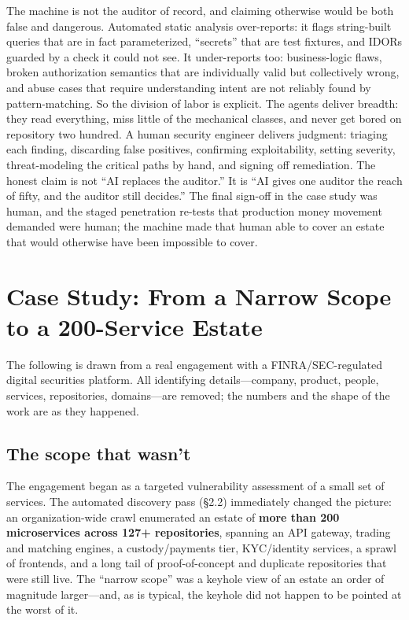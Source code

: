 \documentclass[11pt,letterpaper]{article}
\begin{document}
The machine is not the auditor of record, and claiming otherwise would be both
false and dangerous. Automated static analysis over-reports: it flags
string-built queries that are in fact parameterized, ``secrets'' that are test
fixtures, and IDORs guarded by a check it could not see. It under-reports too:
business-logic flaws, broken authorization semantics that are individually valid
but collectively wrong, and abuse cases that require understanding intent are not
reliably found by pattern-matching. So the division of labor is explicit. The
agents deliver breadth: they read everything, miss little of the mechanical
classes, and never get bored on repository two hundred. A human security engineer
delivers judgment: triaging each finding, discarding false positives, confirming
exploitability, setting severity, threat-modeling the critical paths by hand, and
signing off remediation. The honest claim is not ``AI replaces the auditor.'' It
is ``AI gives one auditor the reach of fifty, and the auditor still decides.'' The
final sign-off in the case study was human, and the staged penetration re-tests
that production money movement demanded were human; the machine made that human
able to cover an estate that would otherwise have been impossible to cover.

\section{Case Study: From a Narrow Scope to a 200-Service Estate}

The following is drawn from a real engagement with a FINRA/SEC-regulated digital
securities platform. All identifying details---company, product, people, services,
repositories, domains---are removed; the numbers and the shape of the work are as
they happened.

\subsection{The scope that wasn't}

The engagement began as a targeted vulnerability assessment of a small set of
services. The automated discovery pass (\S2.2) immediately changed the picture: an
organization-wide crawl enumerated an estate of \textbf{more than 200
microservices across 127+ repositories}, spanning an API gateway, trading and
matching engines, a custody/payments tier, KYC/identity services, a sprawl of
frontends, and a long tail of proof-of-concept and duplicate repositories that
were still live. The ``narrow scope'' was a keyhole view of an estate an order of
magnitude larger---and, as is typical, the keyhole did not happen to be pointed at
the worst of it.
\end{document}
